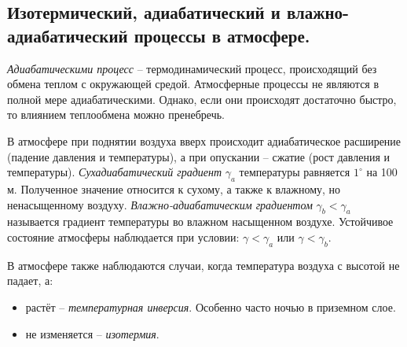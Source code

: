 \subsection{Изотермический, адиабатический и влажно-адиабатический процессы в атмосфере.}
\textit{Адиабатическими процесс} -- термодинамический процесс, происходящий без обмена теплом с окружающей средой.
Атмосферные процессы не являются в полной мере адиабатическими.
Однако, если они происходят достаточно быстро, то влиянием теплообмена можно пренебречь.

В атмосфере при поднятии воздуха вверх происходит адиабатическое расширение (падение давления и температуры), а при опускании -- сжатие (рост давления и температуры).
\textit{Сухадиабатический градиент} $\gamma_a$ температуры равняется $1^\circ$ на 100 м.
Полученное значение относится к сухому, а также к влажному, но ненасыщенному воздуху.
\textit{Влажно-адиабатическим градиентом} $\gamma_b<\gamma_a$ называется градиент температуры во влажном насыщенном воздухе.
Устойчивое состояние атмосферы наблюдается при условии: $\gamma<\gamma_a$ или $\gamma<\gamma_b$.

В атмосфере также наблюдаются случаи, когда температура воздуха с высотой не падает, а:
\begin{itemize}
\item растёт -- \textit{температурная инверсия}. Особенно часто ночью в приземном слое.
\item не изменяется -- \textit{изотермия}.
\end{itemize}

